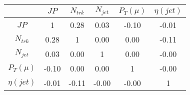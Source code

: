 \begin{tabular}{|c|c|c|c|c|c|} 
\hline
 & $JP$ & $N_{trk}$ & $N_{jet}$ & $P_{T} (\mu)$ & $\eta (jet)$ \\ \hline
$JP$ & 1 & 0.28 & 0.03 & -0.10 & -0.01 \\
$N_{trk}$ & 0.28 & 1 & 0.00 & 0.00 & -0.11 \\
$N_{jet}$ & 0.03 & 0.00 & 1 & 0.00 & -0.00 \\
$P_{T} (\mu)$ & -0.10 & 0.00 & 0.00 & 1 & -0.00 \\
$\eta (jet)$ & -0.01 & -0.11 & -0.00 & -0.00 & 1 \\
\hline 
\end{tabular} 


